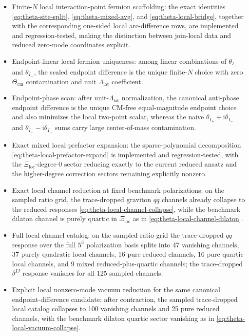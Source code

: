\documentclass[11pt]{article}
\newcommand{\ii}{\mathrm{i}}
\begin{document}
\begin{itemize}
\item Finite-$N$ local interaction-point fermion scaffolding: the exact identities \eqref{eq:theta-site-split}, \eqref{eq:theta-mixed-avg}, and \eqref{eq:theta-local-bridge}, together with the corresponding one-sided local arc-difference rows, are implemented and regression-tested, making the distinction between join-local data and reduced zero-mode coordinates explicit.
\item Endpoint-linear local fermion uniqueness: among linear combinations of $\theta_{I_+}$ and $\theta_{I_-}$, the scaled endpoint difference is the unique finite-$N$ choice with zero $\Theta_{\mathrm{cm}}$ contamination and unit $\Lambda_{\mathrm{lat}}$ coefficient.
\item Endpoint-phase scan: after unit-$\Lambda_{\mathrm{lat}}$ normalization, the canonical anti-phase endpoint difference is the unique CM-free equal-magnitude endpoint choice and also minimizes the local two-point scalar, whereas the naive $\theta_{I_+}+\ii\theta_{I_-}$ and $\theta_{I_+}-\ii\theta_{I_-}$ sums carry large center-of-mass contamination.
\item Exact mixed local prefactor expansion: the sparse-polynomial decomposition \eqref{eq:theta-local-prefactor-expand} is implemented and regression-tested, with the $\Xi_{\mathrm{loc}}$-degree-$0$ sector reducing exactly to the current reduced ansatz and the higher-degree correction sectors remaining explicitly nonzero.
\item Exact local channel reduction at fixed benchmark polarizations: on the sampled ratio grid, the trace-dropped graviton $qq$ channels already collapse to the reduced responses \eqref{eq:theta-local-channel-collapse}, while the benchmark dilaton channel is purely quartic in $\Xi_{\mathrm{loc}}$ as in \eqref{eq:theta-local-channel-dilaton}.
\item Full local channel catalog: on the sampled ratio grid the trace-dropped $qq$ response over the full $5^3$ polarization basis splits into 47 vanishing channels, 37 purely quadratic local channels, 16 pure reduced channels, 16 pure quartic local channels, and 9 mixed reduced-plus-quartic channels; the trace-dropped $\delta^{IJ}$ response vanishes for all 125 sampled channels.
\item Explicit local nonzero-mode vacuum reduction for the same canonical endpoint-difference candidate: after contraction, the sampled trace-dropped local catalog collapses to 100 vanishing channels and 25 pure reduced channels, with the benchmark dilaton quartic sector vanishing as in \eqref{eq:theta-local-vacuum-collapse}.

\end{itemize}
\end{document}
